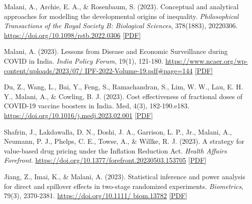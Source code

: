 \begin{tablist}
        \item[2023] \tab{}Malani, A., Archie, E. A., \& Rosenbaum, S. (2023). Conceptual and analytical approaches for modelling the developmental origins of inequality. \textit{Philosophical Transactions of the Royal Society B: Biological Sciences}, 378(1883), 20220306. \href{https://doi.org/10.1098/rstb.2022.0306}{https://doi.org/10.1098/rstb.2022.0306} \href{https://github.com/anup-malani/website_personal/blob/main/publications/2023_MalaniEtAl_PhilTrans_DevtOrigins.pdf}{[PDF]}
        
        \item[2023] \tab{}Malani, A. (2023). Lessons from Disease and Economic Surveillance during COVID in India. \textit{India Policy Forum}, 19(1), 121-180. \href{https://www.ncaer.org/wp-content/uploads/2023/07/IPF-2022-Volume-19.pdf#page=144}{https://www.ncaer.org/wp-content/uploads/2023/07/ IPF-2022-Volume-19.pdf\#page=144} \href{https://github.com/anup-malani/website_personal/blob/main/publications/2023_Malani_LessonCOVIDSurveillanceIndia.pdf}{[PDF]}

        \item[2023] \tab{}Du, Z., Wang, L., Bai, Y., Feng, S., Ramachandran, S., Lim, W. W., Lau, E. H. Y., Malani, A., \& Cowling, B. J. (2023). Cost effectiveness of fractional doses of COVID-19 vaccine boosters in India. Med, 4(3), 182-190.e183. \href{https://doi.org/10.1016/j.medj.2023.02.001}{https://doi.org/10.1016/j.medj.2023.02.001} \href{https://github.com/anup-malani/website_personal/blob/main/publications/2023_DuMalaniEtAl_Med_CoestEffectiveFractionalDoses.pdf}{[PDF]} 

        \item[2023] \tab{}Shafrin, J., Lakdawalla, D. N., Doshi, J. A., Garrison, L. P., Jr., Malani, A., Neumann, P. J., Phelps, C. E., Towse, A., \& Willke, R. J. (2023). A strategy for value-based drug pricing under the Inflation Reduction Act. \textit{Health Affairs Forefront}. \href{https://doi.org/10.1377/forefront.20230503.153705}{https://doi.org/10.1377/forefront.20230503.153705} \href{https://github.com/anup-malani/website_personal/blob/main/publications/2023_ShafrinMalaniEtAl_HealthAffairs_IRAValuePricing.pdf}{[PDF]}

        \item[2023] \tab{}Jiang, Z., Imai, K., \& Malani, A. (2023). Statistical inference and power analysis for direct and spillover effects in two-stage randomized experiments. \textit{Biometrics}, 79(3), 2370-2381. \href{https://doi.org/10.1111/biom.13782}{https://doi.org/10.1111/ biom.13782} \href{https://github.com/anup-malani/website_personal/blob/main/publications/2022_JiangImaiMalani_Biometrics_TwoStageExperiments.pdf}{[PDF]}
        

\end{tablist}
